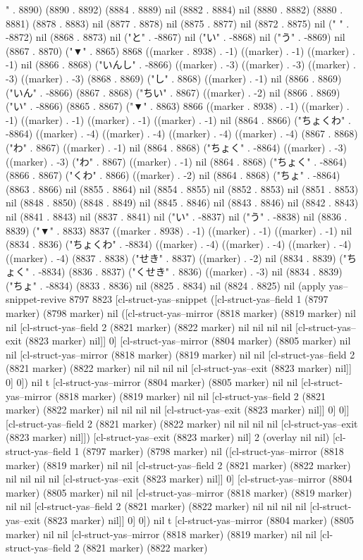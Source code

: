 " . 8890) (8890 . 8892) (8884 . 8889) nil (8882 . 8884) nil (8880 . 8882) (8880 . 8881) (8878 . 8883) nil (8877 . 8878) nil (8875 . 8877) nil (8872 . 8875) nil (" " . -8872) nil (8868 . 8873) nil ("と" . -8867) nil ("い" . -8868) nil ("う" . -8869) nil (8867 . 8870) ("▼" . 8865) 8868 ((marker . 8938) . -1) ((marker) . -1) ((marker) . -1) nil (8866 . 8868) ("いんし" . -8866) ((marker) . -3) ((marker) . -3) ((marker) . -3) ((marker) . -3) (8868 . 8869) ("し" . 8868) ((marker) . -1) nil (8866 . 8869) ("いん" . -8866) (8867 . 8868) ("ちい" . 8867) ((marker) . -2) nil (8866 . 8869) ("い" . -8866) (8865 . 8867) ("▼" . 8863) 8866 ((marker . 8938) . -1) ((marker) . -1) ((marker) . -1) ((marker) . -1) ((marker) . -1) nil (8864 . 8866) ("ちょくわ" . -8864) ((marker) . -4) ((marker) . -4) ((marker) . -4) ((marker) . -4) (8867 . 8868) ("わ" . 8867) ((marker) . -1) nil (8864 . 8868) ("ちょく" . -8864) ((marker) . -3) ((marker) . -3) ("わ" . 8867) ((marker) . -1) nil (8864 . 8868) ("ちょく" . -8864) (8866 . 8867) ("くわ" . 8866) ((marker) . -2) nil (8864 . 8868) ("ちょ" . -8864) (8863 . 8866) nil (8855 . 8864) nil (8854 . 8855) nil (8852 . 8853) nil (8851 . 8853) nil (8848 . 8850) (8848 . 8849) nil (8845 . 8846) nil (8843 . 8846) nil (8842 . 8843) nil (8841 . 8843) nil (8837 . 8841) nil ("い" . -8837) nil ("う" . -8838) nil (8836 . 8839) ("▼" . 8833) 8837 ((marker . 8938) . -1) ((marker) . -1) ((marker) . -1) nil (8834 . 8836) ("ちょくわ" . -8834) ((marker) . -4) ((marker) . -4) ((marker) . -4) ((marker) . -4) (8837 . 8838) ("せき" . 8837) ((marker) . -2) nil (8834 . 8839) ("ちょく" . -8834) (8836 . 8837) ("くせき" . 8836) ((marker) . -3) nil (8834 . 8839) ("ちょ" . -8834) (8833 . 8836) nil (8825 . 8834) nil (8824 . 8825) nil (apply yas--snippet-revive 8797 8823 [cl-struct-yas--snippet ([cl-struct-yas--field 1 (8797 marker) (8798 marker) nil ([cl-struct-yas--mirror (8818 marker) (8819 marker) nil nil [cl-struct-yas--field 2 (8821 marker) (8822 marker) nil nil nil nil [cl-struct-yas--exit (8823 marker) nil]] 0] [cl-struct-yas--mirror (8804 marker) (8805 marker) nil nil [cl-struct-yas--mirror (8818 marker) (8819 marker) nil nil [cl-struct-yas--field 2 (8821 marker) (8822 marker) nil nil nil nil [cl-struct-yas--exit (8823 marker) nil]] 0] 0]) nil t [cl-struct-yas--mirror (8804 marker) (8805 marker) nil nil [cl-struct-yas--mirror (8818 marker) (8819 marker) nil nil [cl-struct-yas--field 2 (8821 marker) (8822 marker) nil nil nil nil [cl-struct-yas--exit (8823 marker) nil]] 0] 0]] [cl-struct-yas--field 2 (8821 marker) (8822 marker) nil nil nil nil [cl-struct-yas--exit (8823 marker) nil]]) [cl-struct-yas--exit (8823 marker) nil] 2 (overlay nil nil) [cl-struct-yas--field 1 (8797 marker) (8798 marker) nil ([cl-struct-yas--mirror (8818 marker) (8819 marker) nil nil [cl-struct-yas--field 2 (8821 marker) (8822 marker) nil nil nil nil [cl-struct-yas--exit (8823 marker) nil]] 0] [cl-struct-yas--mirror (8804 marker) (8805 marker) nil nil [cl-struct-yas--mirror (8818 marker) (8819 marker) nil nil [cl-struct-yas--field 2 (8821 marker) (8822 marker) nil nil nil nil [cl-struct-yas--exit (8823 marker) nil]] 0] 0]) nil t [cl-struct-yas--mirror (8804 marker) (8805 marker) nil nil [cl-struct-yas--mirror (8818 marker) (8819 marker) nil nil [cl-struct-yas--field 2 (8821 marker) (8822 marker) 